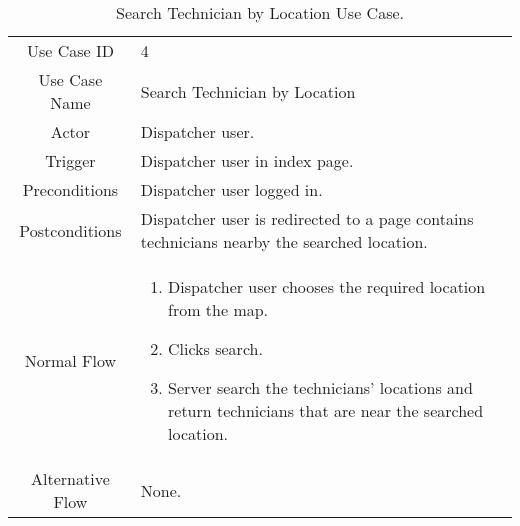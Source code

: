 	\begin{table}[H]
		\centering
		\renewcommand{\arraystretch}{1.5}
		\begin{tabular}[t]{ c  m{10cm} }
			Use Case ID & 4  \\
			Use Case Name & Search Technician by Location \\
			Actor & Dispatcher user. \\
			Trigger & Dispatcher user in index page. \\
			Preconditions & Dispatcher user logged in. \\
			Postconditions & Dispatcher user is redirected to a page contains technicians nearby the searched location. \\
			Normal Flow &\begin{enumerate}
				\item Dispatcher user chooses the required location from the map.
				\item Clicks search.
				\item Server search the technicians' locations and return technicians that are near the searched location.			
			\end{enumerate}\\
			Alternative Flow & None. \\
		\end{tabular}
		\caption{Search Technician by Location Use Case.}
		\renewcommand{\arraystretch}{1.0}
	\end{table}
	
